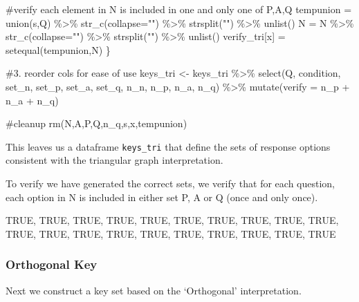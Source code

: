 \documentclass[
  letterpaper,
  DIV=11,
  numbers=noendperiod]{scrreprt}
\newenvironment{Shaded}{\begin{snugshade}}{\end{snugshade}}
\newcommand{\AttributeTok}[1]{\textcolor[rgb]{0.40,0.45,0.13}{#1}}
\newcommand{\CommentTok}[1]{\textcolor[rgb]{0.37,0.37,0.37}{#1}}
\newcommand{\FunctionTok}[1]{\textcolor[rgb]{0.28,0.35,0.67}{#1}}
\newcommand{\NormalTok}[1]{\textcolor[rgb]{0.00,0.23,0.31}{#1}}
\newcommand{\OtherTok}[1]{\textcolor[rgb]{0.00,0.23,0.31}{#1}}
\newcommand{\SpecialCharTok}[1]{\textcolor[rgb]{0.37,0.37,0.37}{#1}}
\newcommand{\StringTok}[1]{\textcolor[rgb]{0.13,0.47,0.30}{#1}}
\begin{document}
\begin{Shaded}
\begin{Highlighting}[]
  \CommentTok{\#verify each element in N is included in one and only one of P,A,Q}
\NormalTok{  tempunion }\OtherTok{=} \FunctionTok{union}\NormalTok{(s,Q) }\SpecialCharTok{\%\textgreater{}\%} \FunctionTok{str\_c}\NormalTok{(}\AttributeTok{collapse=}\StringTok{""}\NormalTok{) }\SpecialCharTok{\%\textgreater{}\%} \FunctionTok{strsplit}\NormalTok{(}\StringTok{""}\NormalTok{) }\SpecialCharTok{\%\textgreater{}\%} \FunctionTok{unlist}\NormalTok{()}
\NormalTok{  N }\OtherTok{=}\NormalTok{ N }\SpecialCharTok{\%\textgreater{}\%} \FunctionTok{str\_c}\NormalTok{(}\AttributeTok{collapse=}\StringTok{""}\NormalTok{) }\SpecialCharTok{\%\textgreater{}\%} \FunctionTok{strsplit}\NormalTok{(}\StringTok{""}\NormalTok{) }\SpecialCharTok{\%\textgreater{}\%} \FunctionTok{unlist}\NormalTok{()}
\NormalTok{  verify\_tri[x] }\OtherTok{=} \FunctionTok{setequal}\NormalTok{(tempunion,N)}
\NormalTok{\}}

\CommentTok{\#3. reorder cols for ease of use}
\NormalTok{keys\_tri }\OtherTok{\textless{}{-}}\NormalTok{ keys\_tri }\SpecialCharTok{\%\textgreater{}\%} \FunctionTok{select}\NormalTok{(Q, condition, set\_n, set\_p, set\_a, set\_q, n\_n, n\_p, n\_a, n\_q) }\SpecialCharTok{\%\textgreater{}\%} \FunctionTok{mutate}\NormalTok{(}\AttributeTok{verify =}\NormalTok{ n\_p }\SpecialCharTok{+}\NormalTok{ n\_a }\SpecialCharTok{+}\NormalTok{ n\_q)}

\CommentTok{\#cleanup }
\FunctionTok{rm}\NormalTok{(N,A,P,Q,n\_q,s,x,tempunion)}
\end{Highlighting}
\end{Shaded}

This leaves us a dataframe \texttt{keys\_tri} that define the sets of
response options consistent with the triangular graph interpretation.

To verify we have generated the correct sets, we verify that for each
question, each option in N is included in either set P, A or Q (once and
only once).

TRUE, TRUE, TRUE, TRUE, TRUE, TRUE, TRUE, TRUE, TRUE, TRUE, TRUE, TRUE,
TRUE, TRUE, TRUE, TRUE, TRUE, TRUE, TRUE, TRUE

\hypertarget{orthogonal-key}{%
\subsubsection{Orthogonal Key}\label{orthogonal-key}}

Next we construct a key set based on the `Orthogonal' interpretation.
\end{document}
